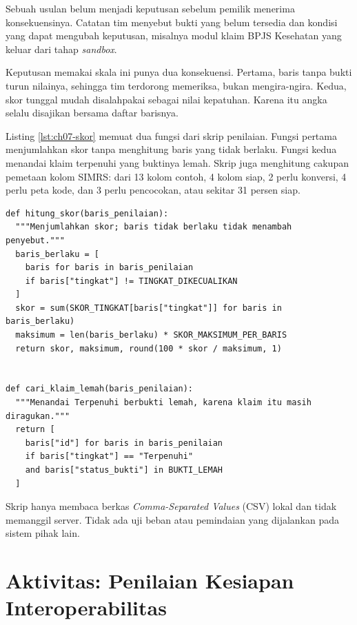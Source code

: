 \begin{kasus}[title={Kasus Medikara Health: Penilaian Kesiapan Interoperabilitas}]
Sebuah usulan belum menjadi keputusan sebelum pemilik menerima konsekuensinya. Catatan tim menyebut bukti yang belum
tersedia dan kondisi yang dapat mengubah keputusan, misalnya modul klaim BPJS Kesehatan yang keluar dari tahap
\textit{sandbox}.
\end{kasus}

Keputusan memakai skala ini punya dua konsekuensi. Pertama, baris tanpa bukti turun nilainya, sehingga tim terdorong
memeriksa, bukan mengira-ngira. Kedua, skor tunggal mudah disalahpakai sebagai nilai kepatuhan. Karena itu angka
selalu disajikan bersama daftar barisnya.

\begin{pendalaman}[title={Pendalaman Teknis (opsional): Menghitung Skor dari Lembar Kesenjangan}]
Listing \ref{lst:ch07-skor} memuat dua fungsi dari skrip penilaian. Fungsi pertama menjumlahkan skor tanpa menghitung
baris yang tidak berlaku. Fungsi kedua menandai klaim terpenuhi yang buktinya lemah. Skrip juga menghitung cakupan
pemetaan kolom SIMRS: dari 13 kolom contoh, 4 kolom siap, 2 perlu konversi, 4 perlu peta kode, dan 3 perlu pencocokan,
atau sekitar 31 persen siap.

\begin{lstlisting}[style=ch07python, caption={Menghitung skor kesiapan, tersedia di \berkas{sources/chapter07/hitung-kesiapan-interoperabilitas.py}}, label={lst:ch07-skor}]
def hitung_skor(baris_penilaian):
  """Menjumlahkan skor; baris tidak berlaku tidak menambah penyebut."""
  baris_berlaku = [
    baris for baris in baris_penilaian
    if baris["tingkat"] != TINGKAT_DIKECUALIKAN
  ]
  skor = sum(SKOR_TINGKAT[baris["tingkat"]] for baris in baris_berlaku)
  maksimum = len(baris_berlaku) * SKOR_MAKSIMUM_PER_BARIS
  return skor, maksimum, round(100 * skor / maksimum, 1)


def cari_klaim_lemah(baris_penilaian):
  """Menandai Terpenuhi berbukti lemah, karena klaim itu masih diragukan."""
  return [
    baris["id"] for baris in baris_penilaian
    if baris["tingkat"] == "Terpenuhi"
    and baris["status_bukti"] in BUKTI_LEMAH
  ]
\end{lstlisting}

Skrip hanya membaca berkas \textit{Comma-Separated Values} (CSV) lokal dan tidak memanggil server. Tidak ada uji beban
atau pemindaian yang dijalankan pada sistem pihak lain.
\end{pendalaman}

\section{Aktivitas: Penilaian Kesiapan Interoperabilitas}


